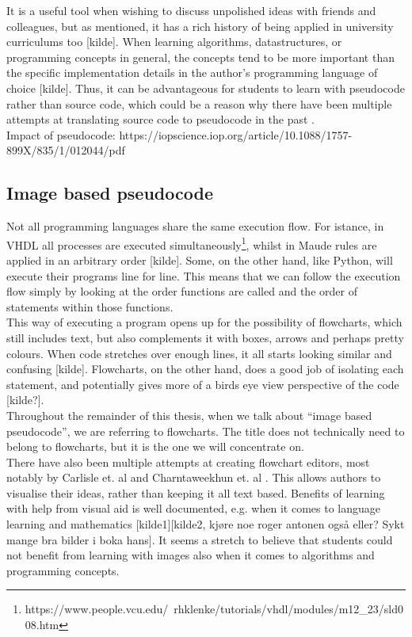 It is a useful tool when wishing to discuss unpolished ideas with friends and colleagues, but as mentioned, it has a rich history of being applied in university curriculums too [kilde]. When learning algorithms, datastructures, or programming concepts in general, the concepts tend to be more important than the specific implementation details in the author’s programming language of choice [kilde]. Thus, it can be advantageous for students to learn with pseudocode rather than source code, which could be a reason why there have been multiple attempts at translating source code to pseudocode in the past \cite{PSEU:/Kreher/Stinson}\cite{DBLP:conf/kbse/OdaFNHSTN15}\cite{DBLP:conf/aswec/AlhefdhiDHG18}. \hfill \\

Impact of pseudocode: https://iopscience.iop.org/article/10.1088/1757-899X/835/1/012044/pdf

\subsection{Image based pseudocode}

Not all programming languages share the same execution flow. For istance, in VHDL all processes are executed simultaneously\footnote{https://www.people.vcu.edu/~rhklenke/tutorials/vhdl/modules/m12\_23/sld008.htm}, whilst in Maude rules are applied in an arbitrary order [kilde]. Some, on the other hand, like Python, will execute their programs line for line. This means that we can follow the execution flow simply by looking at the order functions are called and the order of statements within those functions. \hfill \\

This way of executing a program opens up for the possibility of flowcharts, which still includes text, but also complements it with boxes, arrows and perhaps pretty colours. When code stretches over enough lines, it all starts looking similar and confusing [kilde]. Flowcharts, on the other hand, does a good job of isolating each statement, and potentially gives more of a birds eye view perspective of the code [kilde?]. \hfill \\

Throughout the remainder of this thesis, when we talk about ``image based pseudocode'', we are referring to flowcharts. The title does not technically need to belong to flowcharts, but it is the one we will concentrate on. \hfill \\

There have also been multiple attempts at creating flowchart editors, most notably by Carlisle et. al and Charntaweekhun et. al \cite{carlisle2004}\cite{charntaweekhun2006}. This allows authors to visualise their ideas, rather than keeping it all text based. Benefits of learning with help from visual aid is well documented, e.g. when it comes to language learning and mathematics [kilde1][kilde2, kjøre noe roger antonen også eller? Sykt mange bra bilder i boka hans]. It seems a stretch to believe that students could not benefit from learning with images also when it comes to algorithms and programming concepts. \hfill \\

